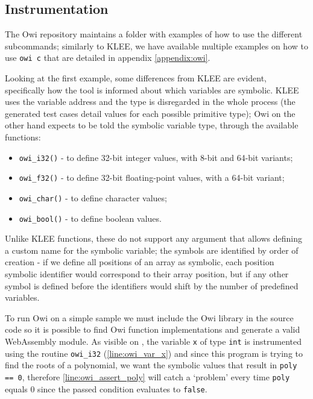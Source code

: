 \subsection{Instrumentation}\label{subsection:owi_instrumentation}

The Owi repository maintains a folder with examples of how to use the different subcommands; similarly to KLEE, we have available multiple examples on how to use \lstinline$owi c$ that are detailed in appendix \ref{appendix:owi}.

Looking at the first example, some differences from KLEE are evident, specifically how the tool is informed about which variables are symbolic. KLEE uses the variable address and the type is disregarded in the whole process (the generated test cases detail values for each possible primitive type); Owi on the other hand expects to be told the symbolic variable type, through the available functions:

\parbox{\textwidth}{
\begin{itemize}
    \item \lstinline$owi_i32()$ - to define 32-bit integer values, with 8-bit and 64-bit variants;
    \item \lstinline$owi_f32()$ - to define 32-bit floating-point values, with a 64-bit variant;
    \item \lstinline$owi_char()$ - to define character values;
    \item \lstinline$owi_bool()$ - to define boolean values.
\end{itemize}
}

Unlike KLEE functions, these do not support any argument that allows defining a custom name for the symbolic variable; the symbols are identified by order of creation - if we define all positions of an array as symbolic, each position symbolic identifier would correspond to their array position, but if any other symbol is defined before the identifiers would shift by the number of predefined variables.

To run Owi on a simple sample we must include the Owi library in the source code so it is possible to find Owi function implementations and generate a valid WebAssembly module. As visible on , the variable \lstinline$x$ of type \lstinline$int$ is instrumented using the routine \lstinline$owi_i32$ (\cref{line:owi_var_x}) and since this program is trying to find the roots of a polynomial, we want the symbolic values that result in \lstinline$poly == 0$, therefore \cref{line:owi_assert_poly} will catch a `problem' every time \lstinline$poly$ equals 0 since the passed condition evaluates to \lstinline$false$.

